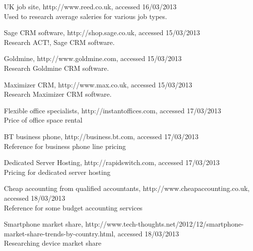 \documentclass{article}
\begin{document}
\begin{thebibliography}{9}
 UK job site, http://www.reed.co.uk, accessed 16/03/2013
\\Used to research average saleries for various job types.

 Sage CRM software, http://shop.sage.co.uk, accessed 15/03/2013
\\Research ACT!, Sage CRM software.

 Goldmine, http://www.goldmine.com, accessed 15/03/2013
\\Research Goldmine CRM software.

 Maximizer CRM, http://www.max.co.uk, accessed 15/03/2013
\\Research Maximizer CRM software.

 Flexible office specialists, http://instantoffices.com, accessed 17/03/2013
\\Price of office space rental

 BT business phone, http://business.bt.com, accessed 17/03/2013
\\Reference for business phone line pricing

 Dedicated Server Hosting, http://rapidswitch.com, accessed 17/03/2013
\\Pricing for dedicated server hosting

 Cheap accounting from qualified accountants, http://www.cheapaccounting.co.uk, accessed 18/03/2013
\\Reference for some budget accounting services

 Smartphone market share, http://www.tech-thoughts.net/2012/12/smartphone-market-share-trends-by-country.html, accessed 18/03/2013
\\Researching device market share

\end{thebibliography}
\end{document}
